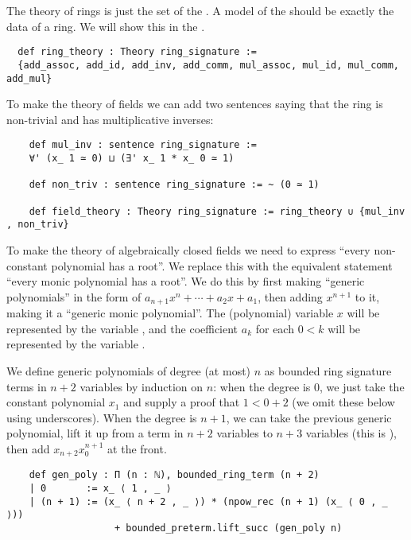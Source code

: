 \begin{dfn}

  The theory of rings is just the set of the
  .
  A model of the  should be exactly the data of a ring.
  We will show this in the .

\begin{lstlisting}
  def ring_theory : Theory ring_signature :=
  {add_assoc, add_id, add_inv, add_comm, mul_assoc, mul_id, mul_comm, add_mul}\end{lstlisting}

  To make the theory of fields we can add two sentences saying that
  the ring is non-trivial and has multiplicative inverses:
  \begin{lstlisting}
    def mul_inv : sentence ring_signature :=
    ∀' (x_ 1 ≃ 0) ⊔ (∃' x_ 1 * x_ 0 ≃ 1)

    def non_triv : sentence ring_signature := ~ (0 ≃ 1)

    def field_theory : Theory ring_signature := ring_theory ∪ {mul_inv , non_triv} \end{lstlisting}

  To make the theory of algebraically closed fields we need to express
  ``every non-constant polynomial has a root''.
  We replace this with the equivalent statement ``every monic polynomial has a root''.
  We do this by first making ``generic polynomials''
  in the form of $a_{n+1}x^{n} + \cdots + a_{2}x + a_{1}$,
  then adding $x^{n+1}$ to it, making it a ``generic monic polynomial''.
  The (polynomial) variable $x$ will be represented by the variable ,
  and the coefficient $a_{k}$ for each $0 < k$ will be represented by the variable
  .

  We define generic polynomials of degree (at most) $n$ as bounded ring signature terms
  in $n + 2$ variables by induction on $n$:
  when the degree is $0$, we just take the constant polynomial $x_{1}$
  and supply a proof that $1 < 0 + 2$ (we omit these below using underscores).
  When the degree is $n + 1$, we can take the previous generic polynomial,
  lift it up from a term in $n + 2$ variables to $n + 3$ variables
  (this is ),
  then add $x_{n + 2} x_{0}^{n+1}$ at the front.

  \begin{lstlisting}
    def gen_poly : Π (n : ℕ), bounded_ring_term (n + 2)
    | 0       := x_ ⟨ 1 , _ ⟩
    | (n + 1) := (x_ ⟨ n + 2 , _ ⟩) * (npow_rec (n + 1) (x_ ⟨ 0 , _ ⟩))
                   + bounded_preterm.lift_succ (gen_poly n)\end{lstlisting}


\end{dfn}
